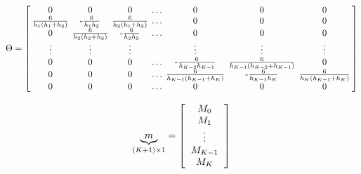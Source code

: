 \documentclass[12pt]{article}
\begin{document}
\begin{equation}
\Theta=\left[
\tabcolsep=0.07cm
\begin{tabular}{ccccccc}
0&0&0 & $\ldots$ & 0&0&0 \\
$\frac{6}{h_1 (h_1+h_2)}$ & -$\frac{6 }{h_1 h_{2}}$  &$\frac{6}{h_2 (h_1+h_2)}$ & $\ldots$ & 0&0&0 \\
0 & $\frac{6}{h_2 (h_2+h_3)}$ & -$\frac{6 }{h_2 h_{3}}$   & $\ldots$ & 0&0&0 \\
$\vdots$  &   $\vdots$  & $\vdots$  & & $\vdots$  &$\vdots$  &$\vdots$   \\
 0&0&0& $\ldots$ & -$\frac{6 }{h_{K-2} h_{K-1}}$ &$\frac{6}{h_{K-1} (h_{K-2}+h_{K-1})}$ &0 \\
 0&0&0& $\ldots$ & $\frac{6}{h_{K-1} (h_{K-1}+h_{K})}$ &-$\frac{6 }{h_{K-1} h_{K}}$ &$\frac{6}{h_{K} (h_{K-1}+h_{K})}$ \\
 0&0&0& $\ldots$ &0&0&0 \\
\end{tabular} \right] \nonumber
\end{equation}

\begin{equation}
\underbrace{m}_{(K+1) \times 1}=\left[
\begin{tabular}{c}
$M_0$ \\
$M_1$ \\
$\vdots$ \\
$M_{K-1}$ \\
$M_{K}$ \\
\end{tabular} \right]
\end{equation}
\end{document}
